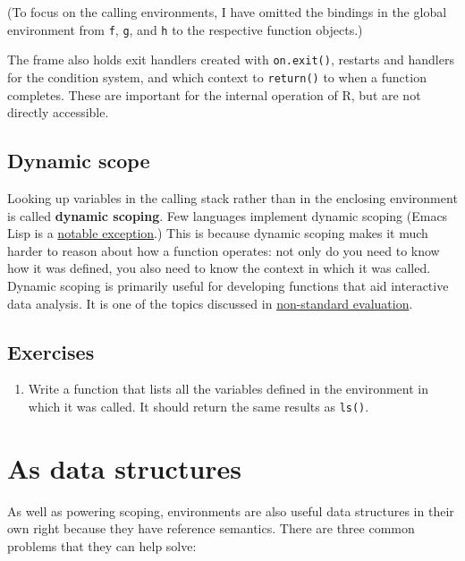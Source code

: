 \documentclass[]{book}
\providecommand{\tightlist}{%
  \setlength{\itemsep}{0pt}\setlength{\parskip}{0pt}}
\theoremstyle{definition}
\theoremstyle{definition}
\theoremstyle{definition}
\theoremstyle{remark}
\begin{document}
(To focus on the calling environments, I have omitted the bindings in
the global environment from \texttt{f}, \texttt{g}, and \texttt{h} to
the respective function objects.)

The frame also holds exit handlers created with \texttt{on.exit()},
restarts and handlers for the condition system, and which context to
\texttt{return()} to when a function completes. These are important for
the internal operation of R, but are not directly accessible.

\hypertarget{dynamic-scope}{%
\subsection{Dynamic scope}\label{dynamic-scope}}

Looking up variables in the calling stack rather than in the enclosing
environment is called \textbf{dynamic scoping}. Few languages implement
dynamic scoping (Emacs Lisp is a
\href{http://www.gnu.org/software/emacs/emacs-paper.html\#SEC15}{notable
exception}.) This is because dynamic scoping makes it much harder to
reason about how a function operates: not only do you need to know how
it was defined, you also need to know the context in which it was
called. Dynamic scoping is primarily useful for developing functions
that aid interactive data analysis. It is one of the topics discussed in
\protect\hyperlink{nse}{non-standard evaluation}.

\hypertarget{exercises-9}{%
\subsection{Exercises}\label{exercises-9}}

\begin{enumerate}
\def\labelenumi{\arabic{enumi}.}
\tightlist
\item
  Write a function that lists all the variables defined in the
  environment in which it was called. It should return the same results
  as \texttt{ls()}.
\end{enumerate}

\hypertarget{explicit-envs}{%
\section{As data structures}\label{explicit-envs}}

As well as powering scoping, environments are also useful data
structures in their own right because they have reference semantics.
There are three common problems that they can help solve:
\end{document}
